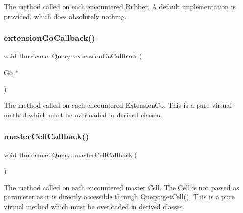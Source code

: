 The method called on each encountered \mbox{\hyperlink{classHurricane_1_1Rubber}{Rubber}}. A default implementation is provided, which does absolutely nothing. \mbox{\label{classHurricane_1_1Query_a75b87e969b64caaf24ec058c0d2dfa68}} 
\subsubsection{\texorpdfstring{extension\+Go\+Callback()}{extensionGoCallback()}}
{\footnotesize\ttfamily void Hurricane\+::\+Query\+::extension\+Go\+Callback (\begin{DoxyParamCaption}\item[{\mbox{\hyperlink{classHurricane_1_1Go}{Go}} $\ast$}]{ }\end{DoxyParamCaption})\hspace{0.3cm}{\ttfamily [pure virtual]}}

The method called on each encountered Extension\+Go. This is a pure virtual method which must be overloaded in derived classes. \mbox{\label{classHurricane_1_1Query_abaf97e93c7fa96469adf64f7865938b4}} 
\subsubsection{\texorpdfstring{master\+Cell\+Callback()}{masterCellCallback()}}
{\footnotesize\ttfamily void Hurricane\+::\+Query\+::master\+Cell\+Callback (\begin{DoxyParamCaption}{ }\end{DoxyParamCaption})\hspace{0.3cm}{\ttfamily [pure virtual]}}

The method called on each encountered master \mbox{\hyperlink{classHurricane_1_1Cell}{Cell}}. The \mbox{\hyperlink{classHurricane_1_1Cell}{Cell}} is not passed as parameter as it is directly accessible through Query\+::get\+Cell(). This is a pure virtual method which must be overloaded in derived classes. \mbox{\label{classHurricane_1_1Query_a63c50b61799b729ff4b2e7e291959b4d}} 
